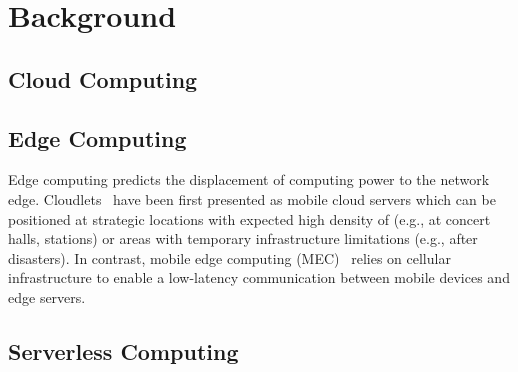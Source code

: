 \section{Background}

\subsection{Cloud Computing}



\subsection{Edge Computing}

Edge computing predicts the displacement of computing power to the network edge. Cloudlets~\cite{CLOUDLETS} have been first presented as mobile cloud servers which can be positioned at strategic locations with expected high density of (e.g., at concert halls, stations) or areas with temporary infrastructure limitations (e.g., after disasters). In contrast, mobile edge computing (MEC)~\cite{MEC} relies on cellular infrastructure to enable a low-latency communication between mobile devices and edge servers. 

\subsection{Serverless Computing}

